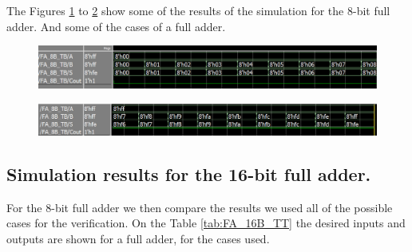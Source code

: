 \documentclass[conference]{IEEEtran}
\begin{document}
	The Figures \ref{fig:fa8bsim1} to \ref{fig:fa8bsim2} show some of the results of the simulation for the 8-bit full adder. And some of the cases of a full adder.
	
	\begin{figure}[H]
		\centering
		\includegraphics[width=0.9\columnwidth]{FA_8B_sim1}
		\caption{}
		\label{fig:fa8bsim1}
	\end{figure}
	
	\begin{figure}[H]
		\centering
		\includegraphics[width=0.9\columnwidth]{FA_8B_sim2}
		\caption{}
		\label{fig:fa8bsim2}
	\end{figure}
	
	
	\subsection{Simulation results for the 16-bit full adder.}
	
	For the 8-bit full adder we then compare the results we used all of the possible cases for the verification. On the Table \ref{tab:FA_16B_TT} the desired inputs and outputs are shown for a full adder, for the cases used.
	
\end{document}
